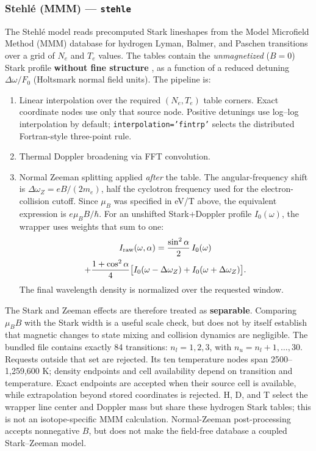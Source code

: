 \documentclass[11pt,a4paper]{article}
\numberwithin{equation}{section}
\begin{document}
\subsubsection{Stehlé (MMM) — \texttt{stehle}}

The Stehlé model reads precomputed Stark lineshapes from the Model Microfield Method (MMM) database \cite{stehle} for hydrogen Lyman, Balmer, and Paschen transitions over a grid of $N_e$ and $T_e$ values.  The tables contain the \emph{unmagnetized} ($B = 0$) Stark profile \textbf{without fine structure} \cite{stehle}, as a function of a reduced detuning $\Delta\omega/F_0$ (Holtsmark normal field units).  The pipeline is:
\begin{enumerate}
    \item Linear interpolation over the required $(N_e, T_e)$ table corners. Exact coordinate nodes use only that source node. Positive detunings use log--log interpolation by default; \texttt{interpolation='fintrp'} selects the distributed Fortran-style three-point rule.
    \item Thermal Doppler broadening via FFT convolution.
    \item Normal Zeeman splitting applied \emph{after} the table. The angular-frequency shift is $\Delta\omega_Z=eB/(2m_e)$, half the cyclotron frequency used for the electron-collision cutoff. Since $\mu_B$ was specified in eV/T above, the equivalent expression is $e\mu_B B/\hbar$. For an unshifted Stark+Doppler profile $I_0(\omega)$, the wrapper uses weights that sum to one:
        \begin{multline}
        I_{\rm raw}(\omega,\alpha)=\frac{\sin^2\alpha}{2}\,I_0(\omega)\\
        +\frac{1+\cos^2\alpha}{4}
          \bigl[I_0(\omega-\Delta\omega_Z)+I_0(\omega+\Delta\omega_Z)\bigr].
        \end{multline}
        The final wavelength density is normalized over the requested window.
\end{enumerate}
The Stark and Zeeman effects are therefore treated as \textbf{separable}. Comparing $\mu_B B$ with the Stark width is a useful scale check, but does not by itself establish that magnetic changes to state mixing and collision dynamics are negligible. The bundled file contains exactly 84 transitions: $n_l=1,2,3$, with $n_u=n_l+1,\ldots,30$. Requests outside that set are rejected. Its ten temperature nodes span 2500--1,259,600 K; density endpoints and cell availability depend on transition and temperature. Exact endpoints are accepted when their source cell is available, while extrapolation beyond stored coordinates is rejected. H, D, and T select the wrapper line center and Doppler mass but share these hydrogen Stark tables; this is not an isotope-specific MMM calculation. Normal-Zeeman post-processing accepts nonnegative $B$, but does not make the field-free database a coupled Stark--Zeeman model.
\end{document}
